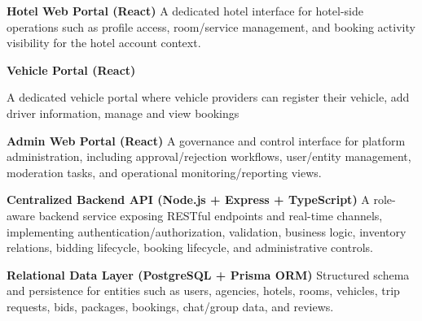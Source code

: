 \documentclass[12pt,a4paper]{article}
\newlength{\ThesisParagraphIndent}
\newcommand{\ThesisParagraph}[1]{%
  \par\begingroup
  \setlength{\leftskip}{\ThesisParagraphIndent}%
  \setlength{\parindent}{0pt}%
  \noindent#1\par
  \endgroup}
\begin{document}
\begin{list}{}{\setlength{\leftmargin}{\dimexpr\ThesisParagraphIndent+1.5em\relax}\setlength{\labelsep}{0.5em}\setlength{\topsep}{2pt}\setlength{\parsep}{0pt}}
\item[3.] \textbf{Hotel Web Portal (React)}\newline{} A dedicated hotel interface for hotel-side operations such as profile access, room/service management, and booking activity visibility for the hotel account context.
\end{list}


\begin{list}{}{\setlength{\leftmargin}{\dimexpr\ThesisParagraphIndent+1.5em\relax}\setlength{\labelsep}{0.5em}\setlength{\topsep}{2pt}\setlength{\parsep}{0pt}}
\item[4.] \textbf{Vehicle Portal (React)}
\end{list}


\ThesisParagraph{A dedicated vehicle portal where vehicle providers can register their vehicle, add driver information, manage and view bookings}


\begin{list}{}{\setlength{\leftmargin}{\dimexpr\ThesisParagraphIndent+1.5em\relax}\setlength{\labelsep}{0.5em}\setlength{\topsep}{2pt}\setlength{\parsep}{0pt}}
\item[5.] \textbf{Admin Web Portal (React)}\newline{} A governance and control interface for platform administration, including approval/rejection workflows, user/entity management, moderation tasks, and operational monitoring/reporting views.
\end{list}


\begin{list}{}{\setlength{\leftmargin}{\dimexpr\ThesisParagraphIndent+1.5em\relax}\setlength{\labelsep}{0.5em}\setlength{\topsep}{2pt}\setlength{\parsep}{0pt}}
\item[6.] \textbf{Centralized Backend API (Node.js + Express + TypeScript)}\newline{} A role-aware backend service exposing RESTful endpoints and real-time channels, implementing authentication/authorization, validation, business logic, inventory relations, bidding lifecycle, booking lifecycle, and administrative controls.
\end{list}


\begin{list}{}{\setlength{\leftmargin}{\dimexpr\ThesisParagraphIndent+1.5em\relax}\setlength{\labelsep}{0.5em}\setlength{\topsep}{2pt}\setlength{\parsep}{0pt}}
\item[7.] \textbf{Relational Data Layer (PostgreSQL + Prisma ORM)}\newline{} Structured schema and persistence for entities such as users, agencies, hotels, rooms, vehicles, trip requests, bids, packages, bookings, chat/group data, and reviews.
\end{list}
\end{document}
